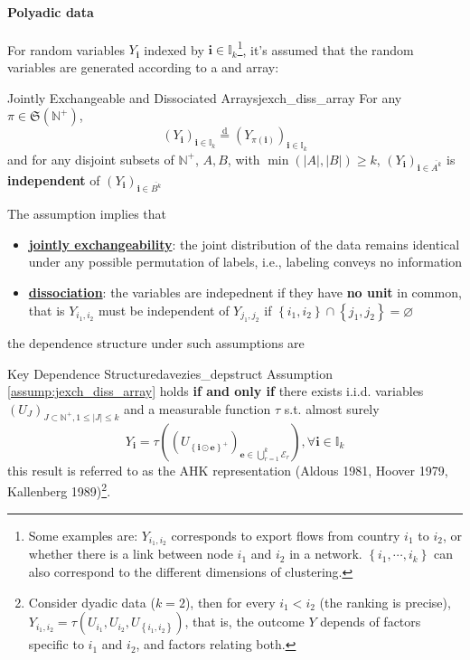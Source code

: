 \documentclass[twoside]{article}
\begin{document}
\paragraph*{Polyadic data}
For random variables $Y_{\mathbf{i}}$ indexed by $\mathbf{i}\in\mathbb{I}_k$\footnote{Some examples are: $Y_{i_1,i_2}$ corresponds to export flows from country $i_1$ to $i_2$, or whether there is a link between node $i_1$ and $i_2$ in a network. $\left\{i_1,\cdots,i_k\right\}$ can also correspond to the different dimensions of clustering.}, it's assumed that the random variables are generated according to a  and  array: 
\begin{assumption}{Jointly Exchangeable and Dissociated Arrays}{jexch_diss_array}
    For any $\pi \in \mathfrak{S}\left(\mathbb{N}^+\right)$, $$ \left(Y_{\mathbf{i}}\right)_{\mathbf{i}\in\mathbb{I}_k} \overset{\mathrm{d}}{=} \left(Y_{\pi(\mathbf{i})}\right)_{\mathbf{i}\in\mathbb{I}_k} $$
    and for any disjoint subsets of $\mathbb{N}^+$, $A,B$, with $\min\left(\left\vert A\right\vert,\left\vert B\right\vert\right)\geq k$, $\left(Y_{\mathbf{i}}\right)_{\mathbf{i}\in\overline{A^k}}$ is \textbf{independent} of $\left(Y_{\mathbf{i}}\right)_{\mathbf{i}\in\overline{B^k}}$
\end{assumption}
The assumption implies that 
\begin{itemize}
    \item \textbf{\underline{jointly exchangeability}}: the joint distribution of the data remains identical under any possible permutation of labels, i.e., labeling conveys no information
    \item \textbf{\underline{dissociation}}: the variables are indepednent if they have \textbf{no unit} in common, that is $Y_{i_1,i_2}$ must be independent of $Y_{j_1,j_2}$ if $\left\{i_1,i_2\right\} \cap \left\{j_1,j_2\right\} = \varnothing$
\end{itemize}
the dependence structure under such assumptions are 
\begin{lemma}{Key Dependence Structure}{davezies_depstruct}
    Assumption \ref{assump:jexch_diss_array} holds \textbf{if and only if} there exists i.i.d. variables $\left(U_J\right)_{J\subset \mathbb{N}^+,1\leq \left\vert J \right\vert \leq k}$ and a measurable function $\tau$ s.t. almost surely
    $$
    Y_{\mathbf{i}} = \tau\left( \left(U_{\left\{\mathbf{i}\odot \mathbf{e}\right\}^+}\right) _{\mathbf{e}\in\bigcup^k_{r=1}\mathcal{E}_r} \right),\forall \mathbf{i}\in\mathbb{I}_k
    $$
    this result is referred to as the AHK representation (Aldous 1981, Hoover 1979, Kallenberg 1989)\footnote{Consider dyadic data ($k=2$), then for every $i_1<i_2$ (the ranking is precise), $ Y_{i_1,i_2} = \tau\left(U_{i_1},U_{i_2},U_{ \left\{i_1,i_2\right\} }\right) $, that is, the outcome $Y$ depends of factors specific to $i_1$ and $i_2$, and factors relating both.}.
\end{lemma}
\end{document}
